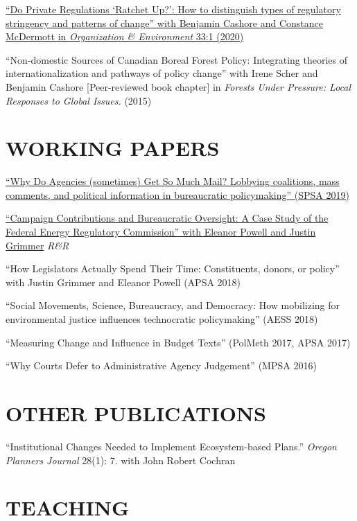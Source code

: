 \documentclass[11pt,]{article}
\begin{document}
\href{https://journals.sagepub.com/doi/full/10.1177/1086026619858874}{``Do
Private Regulations `Ratchet Up?': How to distinguish types of
regulatory stringency and patterns of change'' with Benjamin Cashore and
Constance McDermott in \emph{Organization \& Environment} 33:1 (2020)}

``Non-domestic Sources of Canadian Boreal Forest Policy: Integrating
theories of internationalization and pathways of policy change'' with
Irene Scher and Benjamin Cashore {[}Peer-reviewed book chapter{]} in
\emph{Forests Under Pressure: Local Responses to Global Issues.} (2015)

\hypertarget{working-papers}{%
\section{WORKING PAPERS}\label{working-papers}}

\href{https://judgelord.github.io/research/whymail/}{``Why Do Agencies
(sometimes) Get So Much Mail? Lobbying coalitions, mass comments, and
political information in bureaucratic policymaking'' (SPSA 2019)}

\href{https://judgelord.github.io/research/ferc/}{``Campaign
Contributions and Bureaucratic Oversight: A Case Study of the Federal
Energy Regulatory Commission'' with Eleanor Powell and Justin Grimmer}
\emph{R\&R}

``How Legislators Actually Spend Their Time: Constituents, donors, or
policy'' with Justin Grimmer and Eleanor Powell (APSA 2018)

``Social Movements, Science, Bureaucracy, and Democracy: How mobilizing
for environmental justice influences technocratic policymaking'' (AESS
2018)

``Measuring Change and Influence in Budget Texts'' (PolMeth 2017, APSA
2017)

``Why Courts Defer to Administrative Agency Judgement'' (MPSA 2016)

\hypertarget{other-publications}{%
\section{OTHER PUBLICATIONS}\label{other-publications}}

``Institutional Changes Needed to Implement Ecosystem-based Plans.''
\emph{Oregon Planners Journal} 28(1): 7. with John Robert Cochran

\hypertarget{teaching}{%
\section{TEACHING}\label{teaching}}
\end{document}
